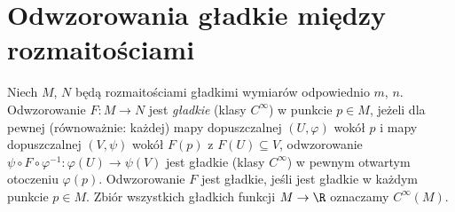 \section{Odwzorowania gładkie między rozmaitościami}

\begin{definicja}
Niech $M$, $N$ będą rozmaitościami gładkimi wymiarów odpowiednio $m$, $n$. Odwzorowanie
$F\colon M\to N$ jest \emph{gładkie} (klasy $C^\infty$) w punkcie $p\in M$, jeżeli dla
pewnej (równoważnie: każdej) mapy dopuszczalnej $(U,\varphi)$ wokół $p$ i mapy
dopuszczalnej $(V,\psi)$ wokół $F(p)$ z $F(U)\subseteq V$, odwzorowanie
$\psi\circ F\circ\varphi^{-1}\colon\varphi(U)\to\psi(V)$
jest gładkie (klasy $C^\infty$) w pewnym otwartym otoczeniu
$\varphi(p)$. Odwzorowanie $F$ jest gładkie, jeśli jest gładkie w każdym punkcie $p\in M$.
Zbiór wszystkich gładkich funkcji $M\to\R$ oznaczamy $C^\infty(M)$.
\end{definicja}
